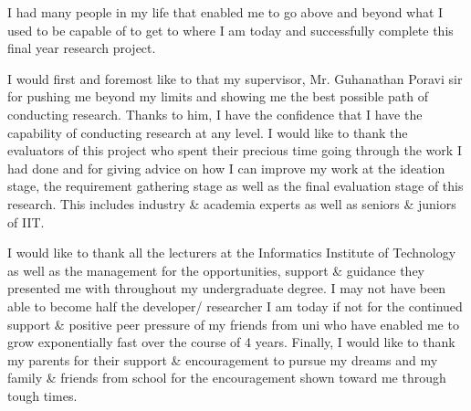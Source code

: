 I had many people in my life that enabled me to go above and beyond what I used to be capable of to get to where I am today and successfully complete this final year research project.

I would first and foremost like to that my supervisor, Mr. Guhanathan Poravi sir for pushing me beyond my limits and showing me the best possible path of conducting research. Thanks to him, I have the confidence that I have the capability of conducting research at any level. I would like to thank the evaluators of this project who spent their precious time going through the work I had done and for giving advice on how I can improve my work at the ideation stage, the requirement gathering stage as well as the final evaluation stage of this research. This includes industry \& academia experts as well as seniors \& juniors of IIT.

I would like to thank all the lecturers at the Informatics Institute of Technology as well as the management for the opportunities, support \& guidance they presented me with throughout my undergraduate degree. I may not have been able to become half the developer/ researcher I am today if not for the continued support \& positive peer pressure of my friends from uni who have enabled me to grow exponentially fast over the course of 4 years. Finally, I would like to thank my parents for their support \& encouragement to pursue my dreams and my family \& friends from school for the encouragement shown toward me through tough times.